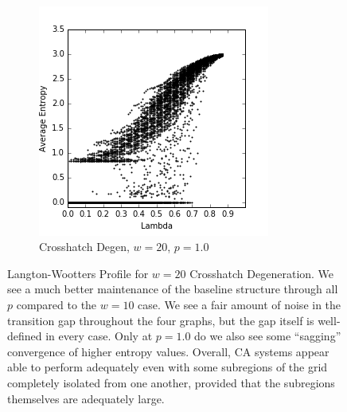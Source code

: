\documentclass[a4paper,11pt,twoside]{report}
\begin{document}
\begin{figure}[htp]
\begin{subfigure}[t]{0.4\textwidth}
  \end{subfigure}
~
\begin{subfigure}[t]{0.4\textwidth}
  \centering
  \includegraphics[width=\textwidth]{ch6_figs/ch_w20_p100_entropy_scatter}
  \caption{Crosshatch Degen, $w=20$, $p=1.0$}
  \label{fig:lw_w20_p100}
  \end{subfigure}

\caption[Crosshatch Langton-Wootters Profile, $w=20$]{
  Langton-Wootters Profile for $w=20$ Crosshatch Degeneration. We see a much better maintenance of the baseline structure through all $p$ compared to the $w=10$ case. We see a fair amount of noise in the transition gap throughout the four graphs, but the gap itself is well-defined in every case. Only at $p=1.0$ do we also see some ``sagging'' convergence of higher entropy values. Overall, CA systems appear able to perform adequately even with some subregions of the grid completely isolated from one another, provided that the subregions themselves are adequately large.
}
\label{fig:lw_ch_20}
\end{figure}
\end{document}
